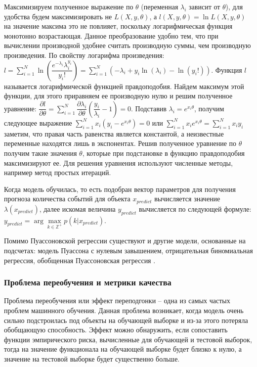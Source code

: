 Максимизируем полученное выражение по $\theta$ (переменная $\lambda_i$ зависит от $\theta$), для удобства будем максимизировать не $L(X,y,\theta)$, а $l(X,y,\theta) = \ln L(X,y,\theta)$ на значение максима это не повлияет, поскольку логарифмическая функция монотонно возрастающая. Данное преобразование удобно тем, что при вычислении производной удобнее считать производную суммы, чем производную произведения. По свойству логарифма произведения: $l = \sum\limits_{i=1}^{N} \ln \left( \dfrac{e^{-\lambda_i} \lambda_i^{y_i}}{y_i!} \right) = \sum\limits_{i=1}^{N} \left( -\lambda_i + y_i \ln(\lambda_i) - \ln(y_i!) \right)$. Функция $l$ называется логарифмической функцией правдоподобия. Найдем максимум этой функции, для этого приравняем ее производную нулю и решим полученное уравнение: $\dfrac{\partial l}{\partial \theta} = \sum\limits_{i=1}^{N} \dfrac{\partial \lambda_i}{\partial \theta} \left( \dfrac{y_i}{\lambda_i} - 1 \right) = 0$. Подставив $\lambda_i = e^{x_i \theta}$, получим следующее выражение $\sum\limits_{i=1}^{N} x_i \left( y_i - e^{x_i\theta} \right) = 0$ или $\sum\limits_{i=1}^{N} x_i e^{x_i\theta} = \sum\limits_{i=1}^{N} x_i y_i$ заметим, что правая часть равенства является константой, а неизвестные переменные находятся лишь в экспонентах. Решив полученное уравнение по $\theta$ получим такие значения $\theta$, которые при подстановке в функцию правдоподобия максимизируют ее. Для решения уравнения используют численные методы, например метод простых итераций.

Когда модель обучилась, то есть подобран вектор параметров для получения прогноза количества событий для объекта $x_{predict}$ вычисляется значение $\lambda(x_{predict})$, далее искомая величина $y_{predict}$ вычисляется по следующей формуле: $y_{predict} = \arg\max\limits_{k \in \mathbb{Z}^+} p(k | x_{predict})$.

Помимо Пуассоновской регрессии существуют и другие модели, основанные на подсчетах: модель Пуассона с нулевым завышением, отрицательная биномиальная регрессия, обобщенная Пуассоновская регрессия \cite{towardsdatascience:poisson_regression}.


\subsubsection{Проблема переобучения и метрики качества}

Проблема переобучения или эффект переподгонки -- одна из самых частых проблем машинного обучения. Данная проблема возникает, когда модель очень сильно подстроилась под объекты на обучающей выборке и из-за этого потеряла обобщающую способность. Эффект можно обнаружить, если сопоставить функции эмпирического риска, вычисленные для обучающей и тестовой выборок, тогда на значение функционала на обучающей выборке будет близко к нулю, а значение на тестовой выборке будет существенно больше.

